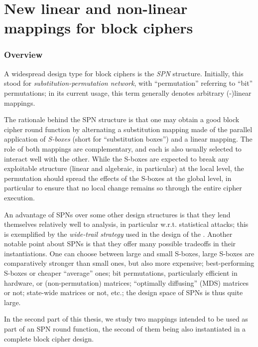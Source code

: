 \part[Nouvelles constructions linéaires et non-linéaires pour chiffres par bloc]
	{New linear and non-linear mappings for block ciphers}
\label{part:constructions}

\section*{Overview}

A widespread design type for block ciphers is the \emph{SPN} structure. Initially, this stood for \emph{substitution-permutation network},
with ``permutation'' referring to ``bit'' permutations; in its current usage, this term generally denotes arbitrary (\ftwo-)linear
mappings.

The rationale behind the SPN structure is that one may obtain a good block cipher round function by alternating a substitution
mapping made of the parallel application of \emph{S-boxes} (short for ``substitution boxes'') and a linear mapping. The role
of both mappings are complementary, and each is also usually selected to interact well with the other. While the S-boxes
are expected to break any exploitable structure (linear and algebraic, in particular) at the local level, the permutation
should spread the effects of the S-boxes at the global level, in particular to ensure that no local change remains so through
the entire cipher execution.

An advantage of SPNs over some other design structures is that they lend themselves relatively well to analysis, in particular w.r.t.
statistical attacks; this is exemplified by the \emph{wide-trail strategy} used in the design of the \aes. Another notable point
about SPNs is that they offer many possible tradeoffs in their instantiations. One can choose between large and small S-boxes,
large S-boxes are comparatively stronger than small ones, but also more expensive; best-performing S-boxes or cheaper
``average'' ones; bit permutations, particularly efficient in hardware, or (non-permutation) matrices; ``optimally diffusing'' (MDS)
matrices or not; state-wide matrices or not, etc.; the design space of SPNs is thus quite large.

\bigskip

In the second part of this thesis, we study two mappings intended to be used as part of an SPN round function, the second
of them being also instantiated in a complete block cipher design.

